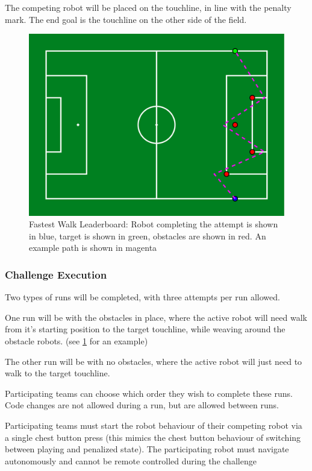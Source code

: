 The competing robot will be placed on the touchline, in line with the penalty mark.
The end goal is the touchline on the other side of the field.

\begin{figure}[t]
    \centerline{\includegraphics[width=\columnwidth]{figs/walk_leaderboard.pdf}}
    \caption{Fastest Walk Leaderboard: Robot completing the attempt is shown in blue, target is shown in green, obstacles are shown in red. An example path is shown in magenta}
    \label{fig:walk_leaderboard}
\end{figure}

\subsubsection{Challenge Execution}
Two types of runs will be completed, with three attempts per run allowed.

One run will be with the obstacles in place, where the active robot will need walk from it's
starting position to the target touchline, while weaving around the obstacle robots. (see \cref{fig:walk_leaderboard} for an example)

The other run will be with no obstacles, where the active robot will just need to walk 
to the target touchline.

Participating teams can choose which order they wish to complete these runs. Code changes are not allowed during a run,
but are allowed between runs.

Participating teams must start the robot behaviour of their competing robot via a single chest button
press (this mimics the chest button behaviour of switching between playing and penalized state).
The participating robot must navigate autonomously and cannot be remote controlled during the challenge


